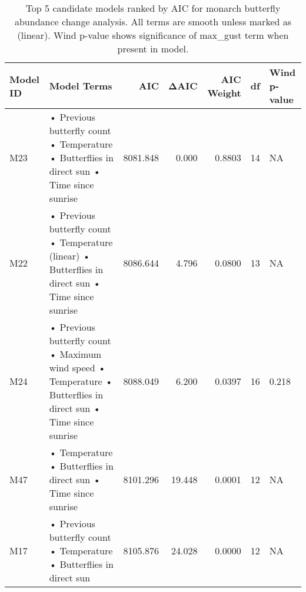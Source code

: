 \begin{table}

\caption{Top 5 candidate models ranked by AIC for monarch butterfly abundance change analysis. All terms are smooth unless marked as (linear). Wind p-value shows significance of max_gust term when present in model.}
\centering
\begin{tabular}[t]{llrrrrl}
\toprule
Model ID & Model Terms & AIC & ΔAIC & AIC Weight & df & Wind p-value\\
\midrule
M23 & • Previous butterfly count
• Temperature
• Butterflies in direct sun
• Time since sunrise & 8081.848 & 0.000 & 0.8803 & 14 & NA\\
M22 & • Previous butterfly count
• Temperature (linear)
• Butterflies in direct sun
• Time since sunrise & 8086.644 & 4.796 & 0.0800 & 13 & NA\\
M24 & • Previous butterfly count
• Maximum wind speed
• Temperature
• Butterflies in direct sun
• Time since sunrise & 8088.049 & 6.200 & 0.0397 & 16 & 0.218\\
M47 & • Temperature
• Butterflies in direct sun
• Time since sunrise & 8101.296 & 19.448 & 0.0001 & 12 & NA\\
M17 & • Previous butterfly count
• Temperature
• Butterflies in direct sun & 8105.876 & 24.028 & 0.0000 & 12 & NA\\
\bottomrule
\end{tabular}
\end{table}
